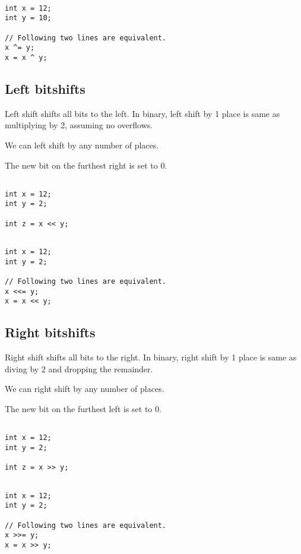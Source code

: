 \begin{verbatim}

int x = 12;
int y = 10;

// Following two lines are equivalent.
x ^= y;
x = x ^ y;

\end{verbatim}

\subsection{Left bitshifts}

Left shift shifts all bits to the left. In binary, left shift by 1 place is same as multiplying by 2, assuming no overflows.

We can left shift by any number of places.

The new bit on the furthest right is set to 0.

\begin{verbatim}

int x = 12;
int y = 2;

int z = x << y;

\end{verbatim}

\begin{verbatim}

int x = 12;
int y = 2;

// Following two lines are equivalent.
x <<= y;
x = x << y;

\end{verbatim}

\subsection{Right bitshifts}

Right shift shifts all bits to the right. In binary, right shift by 1 place is same as diving by 2 and dropping the remainder.

We can right shift by any number of places.

The new bit on the furthest left is set to 0.

\begin{verbatim}

int x = 12;
int y = 2;

int z = x >> y;

\end{verbatim}

\begin{verbatim}

int x = 12;
int y = 2;

// Following two lines are equivalent.
x >>= y;
x = x >> y;

\end{verbatim}

